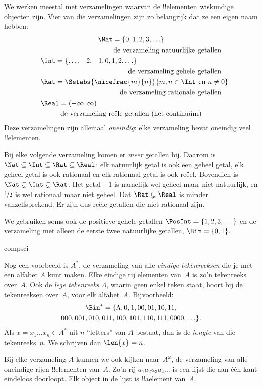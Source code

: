 \documentclass[../../../include/open-logic-section]{subfiles}
\begin{document}

\begin{ex}
We werken meestal met verzamelingen waarvan de !!{element}en wiskundige
objecten zijn. Vier van die verzamelingen zijn zo belangrijk dat ze een eigen
naam hebben:
\begin{multline*}
    \Nat = \{0, 1, 2, 3, \ldots\} \\
    \shoveright{\text{de verzameling natuurlijke getallen}}\\
    \shoveleft{\Int = \{\ldots, -2, -1, 0, 1, 2, \ldots\}} \\
    \shoveright{\text{de verzameling gehele getallen}}\\
    \shoveleft{\Rat = \Setabs{\nicefrac{m}{n}}{m, n \in \Int\text{ en }n \neq 0}}\\
    \shoveright{\text{de verzameling rationale getallen}}\\
    \shoveleft{\Real = (-\infty, \infty)}\\
    \text{de verzameling reële getallen (het continuüm)}
\end{multline*}
Deze verzamelingen zijn allemaal \emph{oneindig}: elke verzameling bevat
oneindig veel !!{element}en.

Bij elke volgende verzameling komen er \emph{meer} getallen bij. Daarom is
$\Nat \subseteq \Int \subseteq \Rat \subseteq \Real$: elk natuurlijk
getal is ook een geheel getal, elk geheel getal is ook rationaal en elk
rationaal getal is ook reëel. Bovendien is $\Nat \subsetneq \Int
\subsetneq \Rat$. Het getal $-1$ is namelijk wel geheel maar niet natuurlijk,
en $\nicefrac{1}{2}$ is wel rationaal maar niet geheel. Dat $\Rat
\subsetneq \Real$ is minder vanzelfsprekend. Er zijn dus reële getallen die
niet rationaal zijn.

We gebruiken soms ook de positieve gehele getallen $\PosInt = \{1,
2, 3, \dots\}$ en de verzameling met alleen de eerste twee natuurlijke
getallen, $\Bin = \{0, 1\}$.
\end{ex}

\begin{tagblock}{compsci}
\begin{ex}[Tekenreeksen]
Nog een voorbeeld is $A^{*}$, de verzameling van alle \emph{eindige
tekenreeksen} die je met een alfabet $A$ kunt maken. Elke eindige rij
elementen van~$A$ is zo'n tekenreeks over~$A$. Ook de
\emph{lege tekenreeks $\Lambda$},
waarin geen enkel teken staat, hoort bij de tekenreeksen over~$A$, voor elk
alfabet~$A$. Bijvoorbeeld:
\begin{multline*}
\Bin^*
=\{\Lambda,0,1,00,01,10,11,\\
000,001,010,011,100,101,110,111,0000,\ldots\}.
\end{multline*}
Als $x=x_{1}\ldots x_{n}\in A^{*}$ uit $n$ ``letters'' van $A$ bestaat,
dan is de \emph{lengte} van die tekenreeks~$n$. We schrijven dan
$\len{x}=n$.
\end{ex}
\end{tagblock}

\begin{ex}
Bij elke verzameling $A$ kunnen we ook kijken naar~$A^\omega$, de verzameling
van alle oneindige rijen !!{element}en van~$A$. Zo'n rij
$a_1a_2a_3a_4\dots$ is een lijst die aan één kant eindeloos doorloopt.
Elk object in de lijst is !!a{element} van~$A$.
\end{ex}
\end{document}
